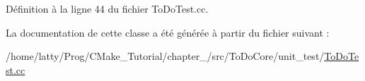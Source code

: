 Définition à la ligne 44 du fichier To\+Do\+Test.\+cc.



La documentation de cette classe a été générée à partir du fichier suivant \+:\begin{DoxyCompactItemize}
\item 
/home/latty/\+Prog/\+C\+Make\+\_\+\+Tutorial/chapter\+\_/src/\+To\+Do\+Core/unit\+\_\+test/\hyperlink{_to_do_test_8cc}{To\+Do\+Test.\+cc}\end{DoxyCompactItemize}
